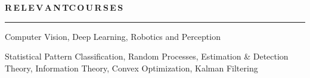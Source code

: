 \documentclass[11pt, a4paper]{article}
\begin{document}

%
%
%
%
%
%
%
%
%
%

\vspace{-4pt}
\textbf{R\,E\,L\,E\,V\,A\,N\,T{\hspace{0.6em}}C\,O\,U\,R\,S\,E\,S}
\vspace{5pt}
\hrule
\vspace{7pt}
Computer Vision, Deep Learning, Robotics and Perception%

Statistical Pattern Classification, Random Processes, Estimation \& Detection Theory, Information
Theory, %
Convex Optimization, Kalman Filtering%
\end{document}
